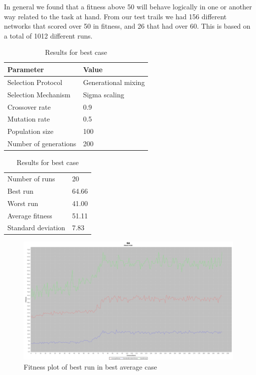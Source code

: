 \documentclass[12pt]{article}
\begin{document}
			In general we found that a fitness above 50 will behave logically in one or another way related to the task at hand. From our test trails we had 156 different networks that scored over 50 in fitness, and 26 that had over 60. This is based on a total of 1012 different runs. 
			\begin{table}[h]
				\parbox{.45\linewidth}{
					\centering
					\begin{tabular}{ll}
						Parameter & Value\\\hline
						Selection Protocol & Generational mixing\\
						Selection Mechanism & Sigma scaling\\
						Crossover rate & 0.9\\
						Mutation rate & 0.5\\
						Population size & 100\\
						Number of generations & 200
					\end{tabular}
					\caption{Parameters used to obtain best average case}
					\label{tab:resultAvoid}
				}
				\hfill
				\parbox{.45\linewidth}{
					\centering
					\begin{tabular}{ll}
						Number of runs & 20 \\
						Best run & 64.66\\
						Worst run & 41.00\\
						\hline
						Average fitness & 51.11\\
						Standard deviation & 7.83\\
					\end{tabular}
					\caption{Results for best case}
					\label{tab:resultAvoid}
				}
			\end{table}
			\begin{figure}%
				\centering
				\includegraphics[width=.8\columnwidth]{./../images/fitness.png}%
				\caption{Fitness plot of best run in best average case}%
				\label{fig:best}%
			\end{figure}
\end{document}

